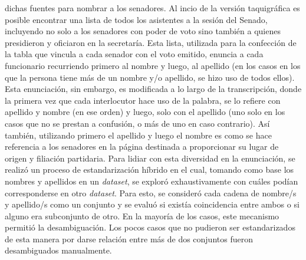 dichas fuentes para nombrar a los senadores. Al incio de la versión taquigráfica
es posible encontrar una lista de todos los asistentes a la sesión del Senado,
incluyendo no solo a los senadores con poder de voto sino también a quienes presidieron
y oficiaron en la secretaría. Esta lista, utilizada para la confección
de la tabla que vincula a cada senador con el voto emitido, enuncia a cada funcionario
recurriendo primero al nombre y luego, al apellido (en los casos en los que
la persona tiene más de un nombre y/o apellido, se hizo uso de todos ellos). Esta
enunciación, sin embargo, es modificada a lo largo de la transcripción, donde la
primera vez que cada interlocutor hace uso de la palabra, se lo refiere con apellido
y nombre (en ese orden) y luego, solo con el apellido (uno solo en los casos que no
se prestan a confusión, o más de uno en caso contrario). Así también, utilizando primero
el apellido y luego el nombre es como se hace referencia a los senadores en la página
destinada a proporcionar su lugar de origen y filiación partidaria. Para lidiar con esta
diversidad en la enunciación, se realizó un proceso de estandarización híbrido en el
cual, tomando como base los nombres y apellidos en un \textit{dataset}, se exploró
exhaustivamente con cuáles podían corresponderse en otro \textit{dataset}. Para esto, se
consideró cada cadena de nombre/s y apellido/s como un conjunto y se evaluó si existía
coincidencia entre ambos o si alguno era subconjunto de otro. En la mayoría de los casos,
este mecanismo permitió la desambiguación. Los pocos casos que no pudieron ser estandarizados
de esta manera por darse relación entre más de dos conjuntos fueron desambiguados manualmente.